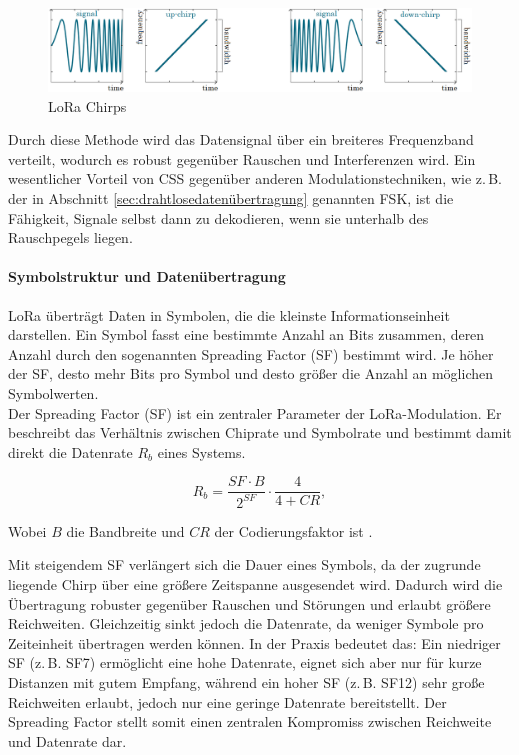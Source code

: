 \begin{figure}[H]
\centering
\includegraphics[scale=.4]{figures/asstes/lora-chirps.png}
\caption{LoRa Chirps \cite{tulkaLoRaSpreadingFactor}}
\label{fig:lora-chirp}
\end{figure}

Durch diese Methode wird das Datensignal über ein breiteres Frequenzband verteilt, wodurch es robust gegenüber Rauschen und Interferenzen wird.  
Ein wesentlicher Vorteil von CSS gegenüber anderen Modulationstechniken, wie z.\,B. der in Abschnitt \ref{sec:drahtlosedatenübertragung} genannten FSK, ist die Fähigkeit, Signale selbst dann zu dekodieren, wenn sie unterhalb des Rauschpegels liegen.



\paragraph*{Symbolstruktur und Datenübertragung}  
LoRa überträgt Daten in Symbolen, die die kleinste Informationseinheit darstellen. Ein Symbol fasst eine bestimmte Anzahl an Bits zusammen, deren Anzahl durch den sogenannten Spreading Factor (SF) bestimmt wird. Je höher der SF, desto mehr Bits pro Symbol und desto größer die Anzahl an möglichen Symbolwerten. \\

Der Spreading Factor (SF) ist ein zentraler Parameter der LoRa-Modulation. Er beschreibt das Verhältnis zwischen Chiprate und Symbolrate und bestimmt damit direkt die Datenrate $R_b$ eines Systems.  

\begin{equation}
\label{eq:spredigfactorbandwith}
R_b = \frac{SF \cdot B}{2^{SF}} \cdot \frac{4}{4 + CR},
\end{equation}

Wobei $B$ die Bandbreite und $CR$ der Codierungsfaktor ist \cite[S.6]{rhode&schwarzCharacterizationLoRaDevices}.  

Mit steigendem SF verlängert sich die Dauer eines Symbols, da der zugrunde liegende Chirp über eine größere Zeitspanne ausgesendet wird. Dadurch wird die Übertragung robuster gegenüber Rauschen und Störungen und erlaubt größere Reichweiten. Gleichzeitig sinkt jedoch die Datenrate, da weniger Symbole pro Zeiteinheit übertragen werden können. In der Praxis bedeutet das: Ein niedriger SF (z.\,B. SF7) ermöglicht eine hohe Datenrate, eignet sich aber nur für kurze Distanzen mit gutem Empfang, während ein hoher SF (z.\,B. SF12) sehr große Reichweiten erlaubt, jedoch nur eine geringe Datenrate bereitstellt. Der Spreading Factor stellt somit einen zentralen Kompromiss zwischen Reichweite und Datenrate dar. \\

